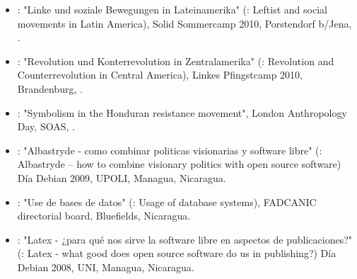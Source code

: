 \begin{itemize}
\item {}: "Linke und soziale Bewegungen in Lateinamerika" (\english: Leftist and social movements in Latin America), Solid Sommercamp 2010, Porstendorf b/Jena, \Germany.

\item {}: "Revolution und Konterrevolution in Zentralamerika" (\english: Revolution and Counterrevolution in Central America), Linkes Pfingstcamp 2010, Brandenburg, \Germany.

\item {}: "Symbolism in the Honduran resistance movement", London Anthropology Day, SOAS, \UK.

\item {}: "Albastryde - como combinar politicas visionarias y software libre" (\english: Albastryde – how to combine visionary politics with open source software) Día Debian 2009, UPOLI, Managua, Nicaragua.

\item {}: "Use de bases de datos" (\english: Usage of database systems), FADCANIC directorial board, Bluefields, Nicaragua.

\item {}: "Latex - ¿para qué nos sirve la software libre en aspectos de publicaciones?" (\english: Latex - what good does open source software do us in publishing?) Día Debian 2008, UNI, Managua, Nicaragua.
\end{itemize}


\section*{\teachingexperience}


